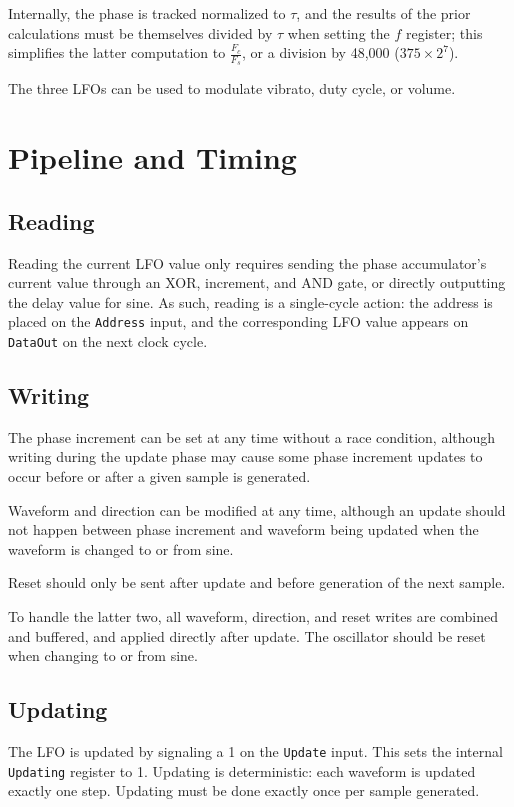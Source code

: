 Internally, the phase is tracked normalized to $\tau$, and the results of the prior calculations must be themselves divided by $\tau$ when setting the $f$ register; this simplifies the latter computation to $\frac{F_c}{F_s}$, or a division by 48,000 ($375 \times 2^7$).

The three LFOs can be used to modulate vibrato, duty cycle, or volume.

\section{Pipeline and Timing}

\subsection{Reading}

Reading the current LFO value only requires sending the phase accumulator's current value through an XOR, increment, and AND gate, or directly outputting the delay value for sine.  As such, reading is a single-cycle action:  the address is placed on the \texttt{Address} input, and the corresponding LFO value appears on \texttt{DataOut} on the next clock cycle.

\subsection{Writing}

The phase increment can be set at any time without a race condition, although writing during the update phase may cause some phase increment updates to occur before or after a given sample is generated.

Waveform and direction can be modified at any time, although an update should not happen between phase increment and waveform being updated when the waveform is changed to or from sine.

Reset should only be sent after update and before generation of the next sample.

To handle the latter two, all waveform, direction, and reset writes are combined and buffered, and applied directly after update.  The oscillator should be reset when changing to or from sine.

\subsection{Updating}

The LFO is updated by signaling a 1 on the \texttt{Update} input.  This sets the internal \texttt{Updating} register to 1.  Updating is deterministic:  each waveform is updated exactly one step.  Updating must be done exactly once per sample generated.

